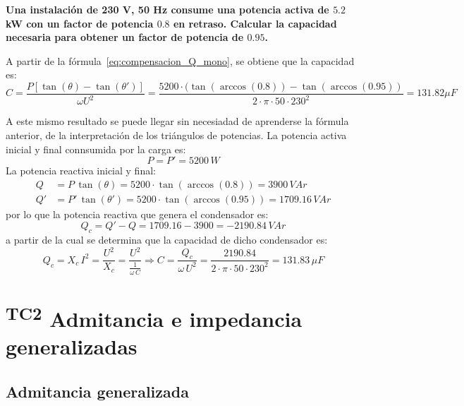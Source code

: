 \begin{example}\label{ex.condensador_Q}
  \textbf{Una instalación de 230 V, 50 Hz consume una potencia activa
    de $5.2$ kW con un factor de potencia $0.8$ en retraso. Calcular
    la capacidad necesaria para obtener un factor de potencia de
    $0.95$.}
	    
  A partir de la fórmula~\eqref{eq:compensacion_Q_mono}, se obtiene
  que la capacidad es:
  \begin{equation*}
    C=\frac{P \left[\tan (\theta) - \tan (\theta')\right]}{\omega U^2}=\dfrac{5200\cdot(\tan(\arccos(0.8))-\tan(\arccos(0.95))}{2\cdot\pi\cdot 50\cdot 230^2}=131.82\mu F
  \end{equation*}
	    
  A este mismo resultado se puede llegar sin necesiadad de aprenderse
  la fórmula anterior, de la interpretación de los triángulos de
  potencias. La potencia activa inicial y final connsumida por la
  carga es:
  \begin{equation*}
    P=P'=5200\,W
  \end{equation*}
  La potencia reactiva inicial y final:
  \begin{align*}
    Q&=P\,\tan(\theta)=5200\cdot\tan(\arccos(0.8))=3900\,VAr\\
    Q'&=P'\,\tan(\theta')=5200\cdot\tan(\arccos(0.95))=1709.16\,VAr
  \end{align*}
  por lo que la potencia reactiva que genera el condensador es:
  \begin{equation*}
    Q_c=Q'-Q=1709.16-3900=-2190.84\,VAr
  \end{equation*}
  a partir de la cual se determina que la capacidad de dicho
  condensador es:
  \begin{equation*}
    Q_c=X_c\,I^2=\dfrac{U^2}{X_c}=\dfrac{U^2}{\frac{1}{\omega\,C}}\Rightarrow C=\dfrac{Q_c}{\omega\,U^2}=\dfrac{2190.84}{2\cdot\pi\cdot 50\cdot 230^2}=131.83\,\mu F
  \end{equation*}
\end{example}
	
\section{\textsuperscript{TC2} Admitancia e impedancia generalizadas}
\label{sec:admitancia-impedancia-generalizada}

\subsection{Admitancia generalizada}
\label{sec:admitancia-generalizada}

